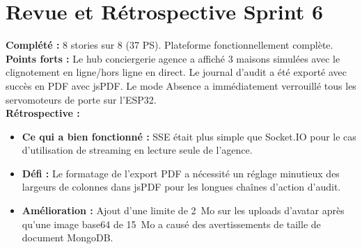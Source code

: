 \section{Revue et Rétrospective Sprint 6}

\begin{tcolorbox}[goalbox,title={Revue Sprint 6}]
\textbf{Complété :} 8 stories sur 8 (37 PS). Plateforme fonctionnellement complète. \\
\textbf{Points forts :} Le hub conciergerie agence a affiché 3 maisons simulées avec le
clignotement en ligne/hors ligne en direct. Le journal d'audit a été exporté avec succès
en PDF avec jsPDF. Le mode Absence a immédiatement verrouillé tous les servomoteurs de
porte sur l'ESP32. \\
\textbf{Rétrospective :}
\begin{itemize}[leftmargin=1cm,itemsep=2pt]
  \item \textbf{Ce qui a bien fonctionné :} SSE était plus simple que Socket.IO pour le
        cas d'utilisation de streaming en lecture seule de l'agence.
  \item \textbf{Défi :} Le formatage de l'export PDF a nécessité un réglage minutieux des
        largeurs de colonnes dans jsPDF pour les longues chaînes d'action d'audit.
  \item \textbf{Amélioration :} Ajout d'une limite de 2~Mo sur les uploads d'avatar après
        qu'une image base64 de 15~Mo a causé des avertissements de taille de document MongoDB.
\end{itemize}
\end{tcolorbox}

